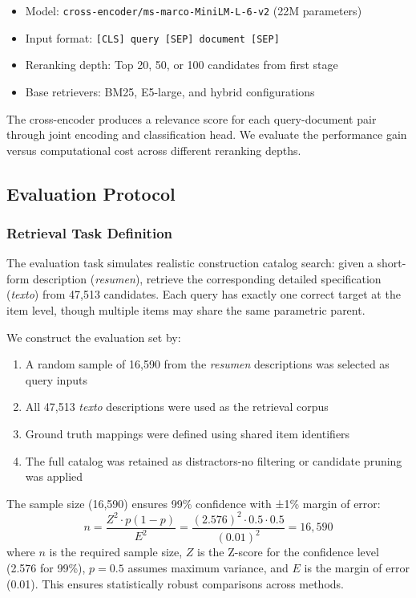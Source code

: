 \documentclass[preprint,12pt]{elsarticle}
\begin{document}
\begin{itemize}
    \item Model: \texttt{cross-encoder/ms-marco-MiniLM-L-6-v2} (22M parameters)
    \item Input format: \texttt{[CLS] query [SEP] document [SEP]}
    \item Reranking depth: Top 20, 50, or 100 candidates from first stage
    \item Base retrievers: BM25, E5-large, and hybrid configurations
\end{itemize}

The cross-encoder produces a relevance score for each query-document pair through joint encoding and classification head. We evaluate the performance gain versus computational cost across different reranking depths.

\subsection{Evaluation Protocol}

\subsubsection{Retrieval Task Definition}

The evaluation task simulates realistic construction catalog search: given a short-form description (\textit{resumen}), retrieve the corresponding detailed specification (\textit{texto}) from 47,513 candidates. Each query has exactly one correct target at the item level, though multiple items may share the same parametric parent.

We construct the evaluation set by:
\begin{enumerate}
    \item A random sample of 16,590 from the \textit{resumen} descriptions was selected as query inputs
    \item All 47,513 \textit{texto} descriptions were used as the retrieval corpus
    \item Ground truth mappings were defined using shared item identifiers
    \item The full catalog was retained as distractors-no filtering or candidate pruning was applied
\end{enumerate}

The sample size (16,590) ensures 99\% confidence with ±1\% margin of error:
\[
n = \frac{Z^2 \cdot p(1 - p)}{E^2} = \frac{(2.576)^2 \cdot 0.5 \cdot 0.5}{(0.01)^2} = 16{,}590
\]
where $n$ is the required sample size, $Z$ is the Z-score for the confidence level (2.576 for 99\%), $p = 0.5$ assumes maximum variance, and $E$ is the margin of error (0.01). This ensures statistically robust comparisons across methods.
\end{document}

